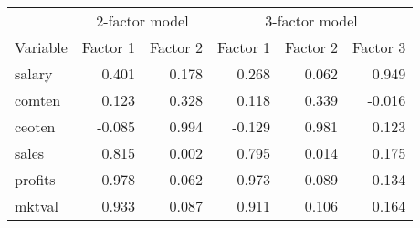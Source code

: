 \begin{tabular}{lrrrrr}
\toprule
 & \multicolumn{2}{c}{2-factor model} & \multicolumn{3}{c}{3-factor model} \\ 
\cmidrule(lr){2-3} \cmidrule(lr){4-6}
Variable & Factor 1 & Factor 2 & Factor 1 & Factor 2 & Factor 3 \\ 
\midrule\addlinespace[2.5pt]
salary & 0.401 & 0.178 & 0.268 & 0.062 & 0.949 \\ 
comten & 0.123 & 0.328 & 0.118 & 0.339 & -0.016 \\ 
ceoten & -0.085 & 0.994 & -0.129 & 0.981 & 0.123 \\ 
sales & 0.815 & 0.002 & 0.795 & 0.014 & 0.175 \\ 
profits & 0.978 & 0.062 & 0.973 & 0.089 & 0.134 \\ 
mktval & 0.933 & 0.087 & 0.911 & 0.106 & 0.164 \\ 
\bottomrule
\end{tabular}

